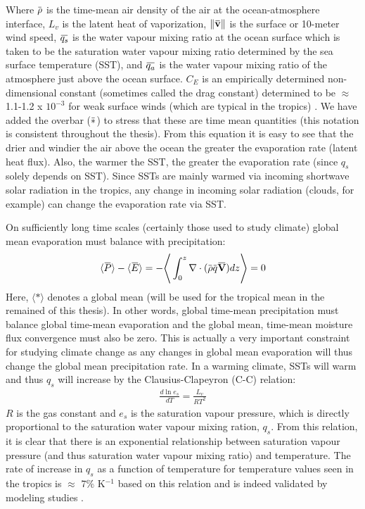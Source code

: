 \documentclass[letterpaper,12pt,titlepage,oneside,final]{book}
\newcommand{\norm}[1]{\lVert#1\rVert}
\newcommand{\overbar}[1]{\mkern 1.5mu\overline{\mkern-1.5mu#1\mkern-1.5mu}\mkern 1.5mu}
\begin{document}
Where $\overbar\rho$ is the time-mean air density of the air at the ocean-atmosphere interface, $L_{v}$ is the latent heat of vaporization, $\norm{\overbar{\textbf{v}}}$ is the surface or 10-meter wind speed, $\overbar{q_{s}}$ is the water vapour mixing ratio at the ocean surface which is taken to be the saturation water vapour mixing ratio determined by the sea surface temperature (SST), and $\overbar{q_{a}}$ is the water vapour mixing ratio of the atmosphere just above the ocean surface. $C_{E}$ is an empirically determined non-dimensional constant (sometimes called the drag constant) determined to be $\approx$ 1.1-1.2 x $10^{-3}$ for weak surface winds (which are typical in the tropics) \citep{katsaros_evaporation_2001}. We have added the overbar ($\overbar{*}$) to stress that these are time mean quantities (this notation is consistent throughout the thesis). From this equation it is easy to see that the drier and windier the air above the ocean the greater the evaporation rate (latent heat flux). Also, the warmer the SST, the greater the evaporation rate (since $q_{s}$ solely depends on SST). Since SSTs are mainly warmed via incoming shortwave solar radiation in the tropics, any change in incoming solar radiation (clouds, for example) can change the evaporation rate via SST. 

On sufficiently long time scales (certainly those used to study climate) global mean evaporation must balance with precipitation:
\begin{align}
\langle\overbar{P}\rangle-\langle\overbar{E}\rangle=-\Bigg\langle\int_{0}^{z}\mathbf{\nabla}\cdot(\overbar{\rho}{\overbar{q}}\overbar{\mathbf{V}})dz\Bigg\rangle=0
\end{align}
Here, $\langle{*}\rangle$ denotes a global mean (will be used for the tropical mean in the remained of this thesis). In other words, global time-mean precipitation must balance global time-mean evaporation and the global mean, time-mean moisture flux convergence must also be zero. This is actually a very important constraint for studying climate change as any changes in global mean evaporation will thus change the global mean precipitation rate. In a warming climate, SSTs will warm and thus $q_{s}$ will increase by the Clausius-Clapeyron (C-C) relation:
\begin{align}
\frac{d\ln{e_{s}}}{dT}=\frac{L_{v}}{RT^{2}}
\end{align}
$R$ is the gas constant and $e_{s}$ is the saturation vapour pressure, which is directly proportional to the saturation water vapour mixing ration, $q_{s}$. From this relation, it is clear that there is an exponential relationship between saturation vapour pressure (and thus saturation water vapour mixing ratio) and temperature. The rate of increase in $q_s$ as a function of temperature for temperature values seen in the tropics is $\approx$ $7 \%$ K$^{-1}$ based on this relation and is indeed validated by modeling studies \citep{held_robust_2006,vecchi_weakening_2006}. 
\end{document}

